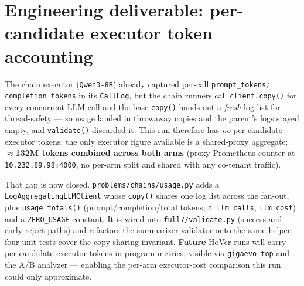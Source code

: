 \documentclass[11pt]{article}
\begin{document}
\section{Engineering deliverable: per-candidate executor token accounting}
\label{sec:tokentrack}
The chain executor (\texttt{Qwen3-8B}) already captured per-call \texttt{prompt\_tokens}/%
\texttt{completion\_tokens} in its \texttt{CallLog}, but the chain runners call
\texttt{client.copy()} for every concurrent LLM call and the base \texttt{copy()} hands out a
\emph{fresh} log list for thread-safety --- so usage landed in throwaway copies and the parent's
logs stayed empty, and \texttt{validate()} discarded it. This run therefore has \emph{no}
per-candidate executor tokens; the only executor figure available is a shared-proxy aggregate:
\textbf{$\approx$132M tokens combined across both arms} (proxy Prometheus counter at
\texttt{10.232.89.98:4000}, no per-arm split and shared with any co-tenant traffic).

That gap is now closed. \texttt{problems/chains/usage.py} adds a \texttt{LogAggregatingLLMClient}
whose \texttt{copy()} shares one log list across the fan-out, plus \texttt{usage\_totals()}
(prompt/completion/total tokens, \texttt{n\_llm\_calls}, \texttt{llm\_cost}) and a
\texttt{ZERO\_USAGE} constant. It is wired into \texttt{full7/validate.py} (success and
early-reject paths) and refactors the summarizer validator onto the same helper; four unit tests
cover the copy-sharing invariant. \textbf{Future} HoVer runs will carry per-candidate executor
tokens in program metrics, visible via \texttt{gigaevo top} and the A/B analyzer --- enabling
the per-arm executor-cost comparison this run could only approximate.
\end{document}
